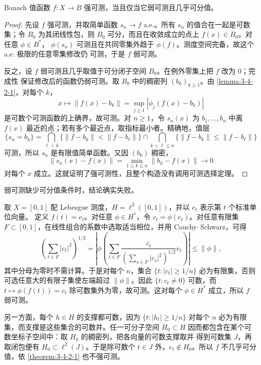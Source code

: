 \begin{theorem}\label{theorem:3-4-2-1}
Banach 值函数 $f:X\to B$ 强可测，当且仅当它弱可测且几乎可分值。
\end{theorem}

\begin{proof}
先设 $f$ 强可测，并取简单函数 $s_n\to f$ a.e.。所有 $s_n$ 的值合在一起是可数集；令 $B_0$
为其闭线性包，则 $B_0$ 可分，而且在收敛成立的点上 $f(x)\in B_0$。对任意 $\phi\in B^*$，
$\phi(s_n)$ 可测且在共同零集外趋于 $\phi(f)$。测度空间完备，故这个 a.e. 极限的任意零集修改仍
可测，于是 $f$ 弱可测。

反之，设 $f$ 弱可测且几乎取值于可分闭子空间 $B_0$。在例外零集上把 $f$ 改为 $0$；完成性
保证修改后的函数仍弱可测。取 $B_0$ 中的稠密列 $(b_k)_{k\ge1}$。由
\cref{lemma:3-4-2-1}，对每个 $k$，
\[
 x\longmapsto\|f(x)-b_k\|
 =\sup_{j\ge1}|\phi_j(f(x)-b_k)|
\]
是可数个可测函数的上确界，故可测。对 $n\ge1$，令 $s_n(x)$ 为
$b_1,\dots,b_n$ 中离 $f(x)$ 最近的点；若有多个最近点，取指标最小者。精确地，值层
\[
 \{s_n=b_k\}
 =\bigcap_{\ell<k}\{\|f-b_k\|<\|f-b_\ell\|\}
  \cap\bigcap_{k<\ell\le n}\{\|f-b_k\|\le\|f-b_\ell\|\}
\]
可测，所以 $s_n$ 是有限值简单函数。又因 $(b_k)$ 稠密，
\[
 \|s_n(x)-f(x)\|=\min_{1\le k\le n}\|b_k-f(x)\|\longrightarrow0
\]
对每个 $x$ 成立。这就证明了强可测性，且整个构造没有调用可测选择定理。
\end{proof}

弱可测缺少可分值条件时，结论确实失败。

\begin{example}[不可分正交族]\label{ex:3-4-2-2}
取 $X=[0,1]$ 配 Lebesgue 测度，$H=\ell^2([0,1])$，并以 $e_t$ 表示第 $t$ 个标准单位向量。
定义 $f(t)=e_t$。对任意 $\phi\in H^*$，令
$c_t=\phi(e_t)$。对任意有限集 $F\subset[0,1]$，在线性组合的系数中选取适当相位，并用
Cauchy--Schwarz，可得
\[
 \left(\sum_{t\in F}|c_t|^2\right)^{1/2}
 =\left|\phi\!\left(
   \sum_{t\in F}\frac{\overline{c_t}}{(\sum_{s\in F}|c_s|^2)^{1/2}}e_t
   \right)\right|
 \le\|\phi\|,
\]
其中分母为零时不需计算。于是对每个 $n$，集合
$\{t:|c_t|\ge1/n\}$ 必为有限集，否则可选任意大的有限子集使左端超过 $\|\phi\|$。因此
$\{t:c_t\ne0\}$ 可数，而
$t\mapsto\phi(f(t))=c_t$ 除可数集外为零，故可测。这对每个 $\phi\in H^*$ 成立，所以 $f$ 弱可测。

另一方面，每个 $h\in H$ 的支撑都可数，因为
$\{t:|h_t|\ge1/n\}$ 对每个 $n$ 必为有限集，而支撑是这些集合的可数并。任一可分子空间
$H_0\subset H$ 因而都包含在某个可数坐标子空间中：取 $H_0$ 的稠密列，把各向量的可数支撑取并
得到可数集 $J$，再取闭包便有 $H_0\subset\ell^2(J)$。于是除可数个
$t\in J$ 外，$e_t\notin H_0$。所以 $f$ 不几乎可分值，依
\cref{theorem:3-4-2-1} 也不强可测。
\end{example}

